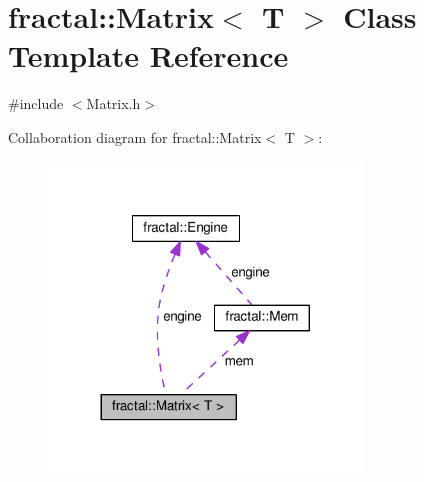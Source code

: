 \hypertarget{classfractal_1_1Matrix}{\section{fractal\+:\+:Matrix$<$ T $>$ Class Template Reference}
\label{classfractal_1_1Matrix}
}


{\ttfamily \#include $<$Matrix.\+h$>$}



Collaboration diagram for fractal\+:\+:Matrix$<$ T $>$\+:\nopagebreak
\begin{figure}[H]
\begin{center}
\leavevmode
\includegraphics[width=236pt]{d3/d86/classfractal_1_1Matrix__coll__graph}
\end{center}
\end{figure}
